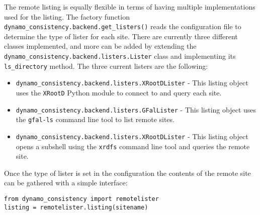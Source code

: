 The remote listing is equally flexible in terms of having
multiple implementations used for the listing.
The factory function \texttt{dynamo\_consistency.backend.get\_listers()}
reads the configuration file to determine the type of lister for each site.
There are currently three different classes implemented,
and more can be added by extending the \texttt{dynamo\_consistency.backend.listers.Lister}
class and implementing its \texttt{ls\_directory} method.
The three current listers are the following:
\begin{itemize}
\item \texttt{dynamo\_consistency.backend.listers.XRootDLister} -
  This listing object uses the \texttt{XRootD} Python module
  to connect to and query each site.
\item \texttt{dynamo\_consistency.backend.listers.GFalLister} -
  This listing object uses the \texttt{gfal-ls} command line tool to list remote sites.
\item \texttt{dynamo\_consistency.backend.listers.XRootDLister} -
  This listing object opens a subshell using the \texttt{xrdfs}
  command line tool and queries the remote site.
\end{itemize}

Once the type of lister is set in the configuration
the contents of the remote site can be gathered with a simple interface:

\begin{verbatim}
from dynamo_consistency import remotelister
listing = remotelister.listing(sitename)
\end{verbatim}


